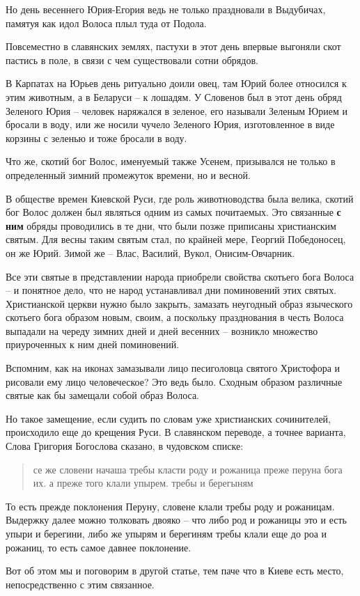 \documentclass[a5paper,11pt,openany]{article}
\begin{document}
   Но день весеннего Юрия-Егория ведь не только праздновали в Выдубичах, памятуя как идол Волоса плыл туда от Подола. 

   Повсеместно в славянских землях, пастухи в этот день впервые выгоняли скот пастись в поле, в связи с чем существовали сотни обрядов.

 В Карпатах на Юрьев день ритуально доили овец, там Юрий более относился к этим животным, а в Беларуси – к лошадям. У Словенов был в этот день обряд Зеленого Юрия – человек наряжался в зеленое, его называли Зеленым Юрием и бросали в воду, или же носили чучело Зеленого Юрия, изготовленное в виде корзины с зеленью и тоже бросали в воду.

  Что же, скотий бог Волос, именуемый также Усенем, призывался не только в определенный зимний промежуток времени, но и весной. 

  В обществе времен Киевской Руси, где роль животноводства была велика, скотий бог Волос должен был являться одним из самых почитаемых. Это связанные \textbf{с ним} обряды проводились в те дни, что были позже приписаны христианским святым. Для весны таким святым стал, по крайней мере, Георгий Победоносец, он же Юрий. Зимой же – Влас, 
Василий, Вукол, Онисим-Овчарник.

  Все эти святые в представлении народа приобрели свойства скотьего бога Волоса – и понятное дело, что не народ устанавливал дни поминовений этих святых. Христианской церкви нужно было закрыть, замазать неугодный образ языческого скотьего бога образом новым, своим, а поскольку празднования в честь Волоса выпадали на череду зимних дней и дней весенних – возникло множество приуроченных к ним дней поминовений.

 Вспомним, как на иконах замазывали лицо песиголовца святого Христофора и рисовали ему лицо человеческое? Это ведь было. Сходным образом различные святые как бы замещали собой образ Волоса. 

   Но такое замещение, если судить по словам уже христианских сочинителей, происходило еще до крещения Руси. В славянском переводе, а точнее варианта, Слова Григория Богослова сказано, в чудовском списке:

\begin{quotation}
\noindent се же словени начаша требы класти роду и рожаница преже перуна бога их. а преже того клали упырем. требы и берегыням
\end{quotation}

То есть прежде поклонения Перуну, словене клали требы роду и рожаницам. Выдержку далее можно толковать двояко – что либо род и рожаницы это и есть упыри и берегини, либо же упырям и берегиням требы клали еще до роа и рожаниц, то есть самое давнее поклонение. 

   Вот об этом мы и поговорим в другой статье, тем паче что в Киеве есть место, непосредственно с этим связанное.

\newpage





%

\begin{thebibliography}{999}

\end{thebibliography}
\end{document}
